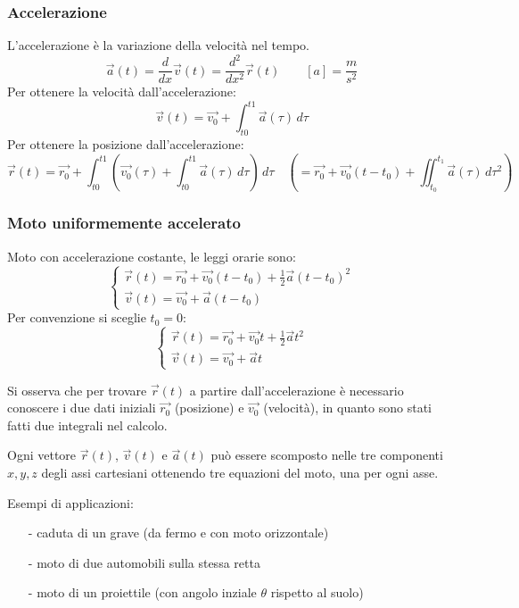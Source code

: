 \documentclass[a4paper]{article}
\begin{document}
\subsubsection*{Accelerazione}
L'accelerazione è la variazione della velocità nel tempo. \[\vec{a}(t) = \frac{d}{dx} \vec{v}(t) = \frac{d^2}{dx^2} \vec{r}(t) \qquad \left[a\right] = \frac{m}{s^2}\]
Per ottenere la velocità dall'accelerazione: \[\vec{v}(t) = \vec{v_0} + \int_{t0}^{t1} \vec{a}(\tau) \, d\tau\]
Per ottenere la posizione dall'accelerazione: \[\vec{r}(t) = \vec{r_0} + \int_{t0}^{t1} \left( \vec{v_0}(\tau) + \int_{t0}^{t1} \vec{a}(\tau) \, d\tau \right) \, d\tau \quad \left(= \vec{r_0} + \vec{v_0}(t-t_0) + \iint_{t_0}^{t_1} \vec{a}(\tau) \, d\tau^2 \right)\]

\subsubsection*{Moto uniformemente accelerato}
Moto con accelerazione costante, le leggi orarie sono:
\[ \begin{cases}
	\vec{r}(t) = \vec{r_0} + \vec{v_0}(t-t_0) + \frac{1}{2}\vec{a}(t-t_0)^2 \\
	\vec{v}(t) = \vec{v_0} + \vec{a}(t-t_0)
\end{cases} \]
Per convenzione si sceglie \(t_0 = 0\):
\[ \begin{cases}
	\vec{r}(t) = \vec{r_0} + \vec{v_0}t + \frac{1}{2}\vec{a}t^2 \\
	\vec{v}(t) = \vec{v_0} + \vec{a}t
\end{cases} \]

Si osserva che per trovare \(\vec{r}(t)\) a partire dall'accelerazione è necessario conoscere i due dati iniziali \(\vec{r_0}\)
(posizione) e \(\vec{v_0}\) (velocità), in quanto sono stati fatti due integrali nel calcolo.

Ogni vettore \(\vec{r}(t)\), \(\vec{v}(t)\) e \(\vec{a}(t)\) può essere scomposto nelle tre componenti \(x, y, z\) degli assi cartesiani
ottenendo tre equazioni del moto, una per ogni asse.

Esempi di applicazioni:
\begin{itemize}
	\item[-] caduta di un grave (da fermo e con moto orizzontale)
	\item[-] moto di due automobili sulla stessa retta
	\item[-] moto di un proiettile (con angolo inziale \(\theta\) rispetto al suolo)
\end{itemize}
\end{document}

